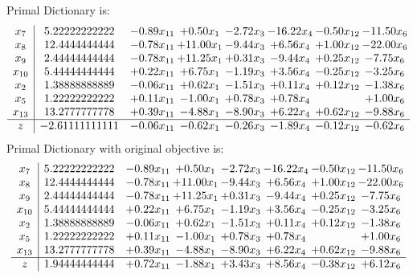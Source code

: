 \documentclass[9pt]{article}
\begin{document}
Primal Dictionary is:
\[\begin{array}{c| c c@{\hskip 2pt} c@{\hskip 2pt} c@{\hskip 2pt} c@{\hskip 2pt} c@{\hskip 2pt} c@{\hskip 2pt} }
 x_{7}   &  5.22222222222 & -0.89 x_{11} & +  0.50 x_{1} & -2.72 x_{3} & -16.22 x_{4} & -0.50 x_{12} & -11.50 x_{6}\\
 x_{8}   &  12.4444444444 & -0.78 x_{11} & + 11.00 x_{1} & -9.44 x_{3} & +  6.56 x_{4} & +  1.00 x_{12} & -22.00 x_{6}\\
 x_{9}   &  2.44444444444 & -0.78 x_{11} & + 11.25 x_{1} & +  0.31 x_{3} & -9.44 x_{4} & +  0.25 x_{12} & -7.75 x_{6}\\
 x_{10}   &  5.44444444444 & +  0.22 x_{11} & +  6.75 x_{1} & -1.19 x_{3} & +  3.56 x_{4} & -0.25 x_{12} & -3.25 x_{6}\\
 x_{2}   &  1.38888888889 & -0.06 x_{11} & +  0.62 x_{1} & -1.51 x_{3} & +  0.11 x_{4} & +  0.12 x_{12} & -1.38 x_{6}\\
 x_{5}   &  1.22222222222 & +  0.11 x_{11} & -1.00 x_{1} & +  0.78 x_{3} & +  0.78 x_{4} &   & +  1.00 x_{6}\\
 x_{13}   &  13.2777777778 & +  0.39 x_{11} & -4.88 x_{1} & -8.90 x_{3} & +  6.22 x_{4} & +  0.62 x_{12} & -9.88 x_{6}\\
\hline
z    &  -2.61111111111 & -0.06 x_{11} & -0.62 x_{1} & -0.26 x_{3} & -1.89 x_{4} & -0.12 x_{12} & -0.62 x_{6}\\
\end{array}\]
Primal Dictionary with original objective is:
\[\begin{array}{c| c c@{\hskip 2pt} c@{\hskip 2pt} c@{\hskip 2pt} c@{\hskip 2pt} c@{\hskip 2pt} c@{\hskip 2pt} }
 x_{7}   &  5.22222222222 & -0.89 x_{11} & +  0.50 x_{1} & -2.72 x_{3} & -16.22 x_{4} & -0.50 x_{12} & -11.50 x_{6}\\
 x_{8}   &  12.4444444444 & -0.78 x_{11} & + 11.00 x_{1} & -9.44 x_{3} & +  6.56 x_{4} & +  1.00 x_{12} & -22.00 x_{6}\\
 x_{9}   &  2.44444444444 & -0.78 x_{11} & + 11.25 x_{1} & +  0.31 x_{3} & -9.44 x_{4} & +  0.25 x_{12} & -7.75 x_{6}\\
 x_{10}   &  5.44444444444 & +  0.22 x_{11} & +  6.75 x_{1} & -1.19 x_{3} & +  3.56 x_{4} & -0.25 x_{12} & -3.25 x_{6}\\
 x_{2}   &  1.38888888889 & -0.06 x_{11} & +  0.62 x_{1} & -1.51 x_{3} & +  0.11 x_{4} & +  0.12 x_{12} & -1.38 x_{6}\\
 x_{5}   &  1.22222222222 & +  0.11 x_{11} & -1.00 x_{1} & +  0.78 x_{3} & +  0.78 x_{4} &   & +  1.00 x_{6}\\
 x_{13}   &  13.2777777778 & +  0.39 x_{11} & -4.88 x_{1} & -8.90 x_{3} & +  6.22 x_{4} & +  0.62 x_{12} & -9.88 x_{6}\\
\hline
z    &  1.94444444444 & +  0.72 x_{11} & -1.88 x_{1} & +  3.43 x_{3} & +  8.56 x_{4} & -0.38 x_{12} & +  6.12 x_{6}\\
\end{array}\]
\end{document}
